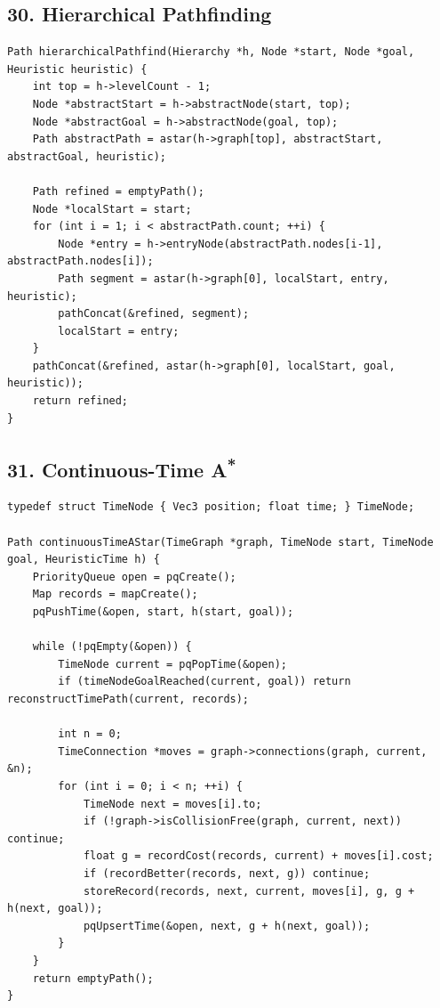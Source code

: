 \documentclass[10pt,letterpaper]{article}
\begin{document}
\subsection*{30. Hierarchical Pathfinding}
{}

\begin{verbatim}
Path hierarchicalPathfind(Hierarchy *h, Node *start, Node *goal, Heuristic heuristic) {
    int top = h->levelCount - 1;
    Node *abstractStart = h->abstractNode(start, top);
    Node *abstractGoal = h->abstractNode(goal, top);
    Path abstractPath = astar(h->graph[top], abstractStart, abstractGoal, heuristic);

    Path refined = emptyPath();
    Node *localStart = start;
    for (int i = 1; i < abstractPath.count; ++i) {
        Node *entry = h->entryNode(abstractPath.nodes[i-1], abstractPath.nodes[i]);
        Path segment = astar(h->graph[0], localStart, entry, heuristic);
        pathConcat(&refined, segment);
        localStart = entry;
    }
    pathConcat(&refined, astar(h->graph[0], localStart, goal, heuristic));
    return refined;
}
\end{verbatim}

\subsection*{31. Continuous-Time \texorpdfstring{A\textsuperscript{*}}{A*}}
{}

\begin{verbatim}
typedef struct TimeNode { Vec3 position; float time; } TimeNode;

Path continuousTimeAStar(TimeGraph *graph, TimeNode start, TimeNode goal, HeuristicTime h) {
    PriorityQueue open = pqCreate();
    Map records = mapCreate();
    pqPushTime(&open, start, h(start, goal));

    while (!pqEmpty(&open)) {
        TimeNode current = pqPopTime(&open);
        if (timeNodeGoalReached(current, goal)) return reconstructTimePath(current, records);

        int n = 0;
        TimeConnection *moves = graph->connections(graph, current, &n);
        for (int i = 0; i < n; ++i) {
            TimeNode next = moves[i].to;
            if (!graph->isCollisionFree(graph, current, next)) continue;
            float g = recordCost(records, current) + moves[i].cost;
            if (recordBetter(records, next, g)) continue;
            storeRecord(records, next, current, moves[i], g, g + h(next, goal));
            pqUpsertTime(&open, next, g + h(next, goal));
        }
    }
    return emptyPath();
}
\end{verbatim}
\end{document}
